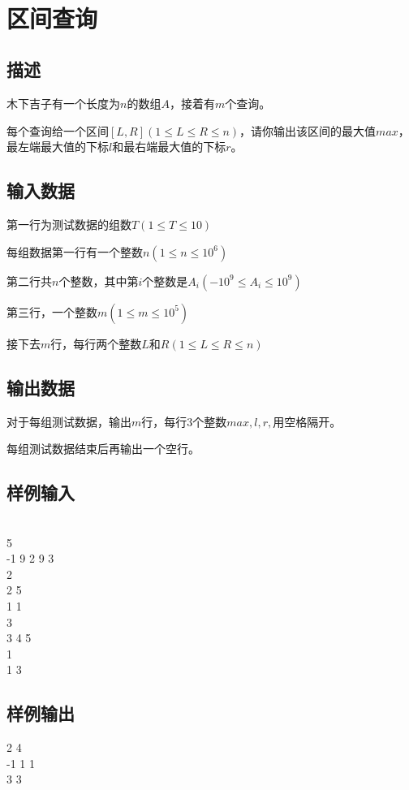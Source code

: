 \documentclass[UTF8]{ctexrep}
\begin{document}
\tt
{}
\fi


\section{区间查询}
\subsection*{描述}
木下吉子有一个长度为$n$的数组$A$，接着有$m$个查询。

每个查询给一个区间$[L,R](1\leqslant L\leqslant R\leqslant n)$，请你输出该区间的最大值$max$，最左端最大值的下标$l$和最右端最大值的下标$r$。

\subsection*{输入数据}
第一行为测试数据的组数$T(1\leqslant T\leqslant 10)$

每组数据第一行有一个整数$n(1\leqslant n\leqslant 10^6)$

第二行共$n$个整数，其中第$i$个整数是$A_i(-10^9\leqslant A_i\leqslant 10^9)$

第三行，一个整数$m(1\leqslant m\leqslant 10^5)$

接下去$m$行，每行两个整数$L$和$R(1\leqslant L\leqslant R\leqslant n)$

\subsection*{输出数据}
对于每组测试数据，输出$m$行，每行3个整数$max,l,r,$用空格隔开。

每组测试数据结束后再输出一个空行。

\subsection*{样例输入}
\\
5\\
-1 9 2 9 3\\
2\\
2 5\\
1 1\\
3\\
3 4 5\\
1\\
1 3

\subsection*{样例输出}
 2 4\\
-1 1 1\\

 3 3


\ifx\allfiles\undefined
\end{document}
